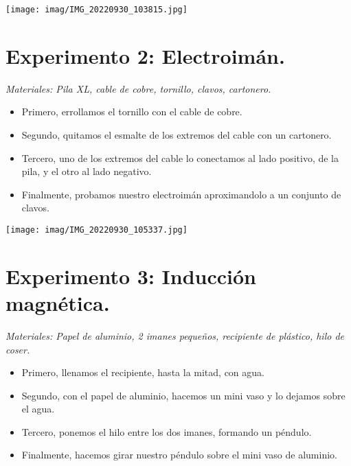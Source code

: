 \documentclass[]{article}
\newenvironment{Figura}
  {\par\medskip\noindent\minipage{\linewidth}}
  {\endminipage\par\medskip}
\begin{document}
\begin{multicols*}{2}
\begin{Figura}
    \centering
    \texttt{[image: imag/IMG\_20220930\_103815.jpg]}
\end{Figura}





\section*{Experimento 2: Electroimán.}
\textit{Materiales: Pila XL, cable de cobre, tornillo, clavos, cartonero.}

\vspace{-\topsep}
\begin{itemize}
    \setlength{\parskip}{0pt} 
    \setlength{\itemsep}{0pt plus 1pt}
    \item Primero, errollamos el tornillo con el cable de cobre.
    \item Segundo, quitamos el esmalte de los extremos del cable con un cartonero.
    \item Tercero, uno de los extremos del cable lo conectamos al lado positivo, de la pila, y el otro al lado negativo.
    \item Finalmente, probamos nuestro electroimán aproximandolo a un conjunto de clavos.
\end{itemize}
\vspace{-\topsep}

\begin{Figura}
    \centering
    \texttt{[image: imag/IMG\_20220930\_105337.jpg]}
\end{Figura}




    
\section*{Experimento 3: Inducción magnética.}
\textit{Materiales: Papel de aluminio, 2 imanes pequeños, recipiente de plástico, hilo de coser.}
\vspace{-\topsep}
    \begin{itemize}
       \setlength{\parskip}{0pt} 
       \setlength{\itemsep}{0pt plus 1pt}
        \item Primero, llenamos el recipiente, hasta la mitad, con agua.
        \item Segundo, con el papel de aluminio, hacemos un mini vaso y lo dejamos sobre el agua.
        \item Tercero, ponemos el hilo entre los dos imanes, formando un péndulo.
        \item Finalmente, hacemos girar nuestro péndulo sobre el mini vaso de aluminio.
    \end{itemize}
\vspace{-\topsep}



\end{multicols*}
\end{document}
